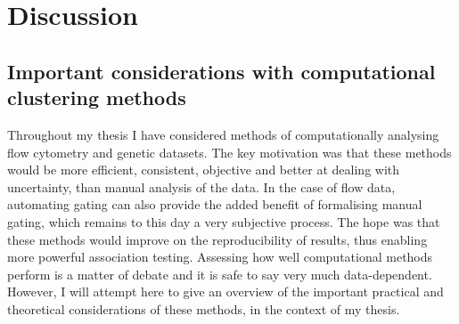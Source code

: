 \chapter{Discussion}


\section{ Important considerations with computational clustering methods }

Throughout my thesis I have considered methods of computationally analysing flow cytometry and genetic datasets.
The key motivation was that these methods would be more efficient, consistent, objective and better at dealing with uncertainty, than manual analysis of the data.
In the case of flow data, automating gating can also provide the added benefit of formalising manual gating, which remains to this day a very subjective process.
The hope was that these methods would improve on the reproducibility of results, thus enabling more powerful association testing.
Assessing how well computational methods perform is a matter of debate and it is safe to say very much data-dependent.
However, I will attempt here to give an overview of the important practical and theoretical considerations of these methods, in the context of my thesis.

